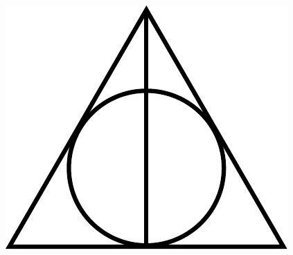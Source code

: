 \vspace*{\fill}
{
\begin{center}
\includegraphics[scale=0.125]{images/Deathly_Hallows_Sign.pdf}
\end{center}
}
\vspace*{\fill}
\clearpage

